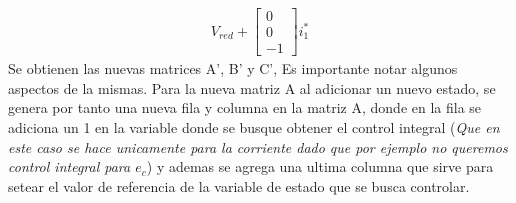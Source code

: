 \documentclass[
  11pt,
  letterpaper,
   addpoints,
   answers
  ]{exam}
\begin{document}
\begin{questions}
\begin{solution}
\begin{align}
            V_{red}
            +
            \begin{bmatrix}
                0\\
                0\\
                -1
            \end{bmatrix}
            i^{*}_{1}
        \end{align}
        Se obtienen las nuevas matrices A', B' y C', Es importante notar algunos aspectos de la mismas. Para la nueva matriz A al adicionar un nuevo estado, se genera por tanto una nueva fila y columna en la matriz A, donde en la fila se adiciona un 1 en la variable donde se busque obtener el control integral (\textit{Que en este caso se hace unicamente para la corriente dado que por ejemplo no queremos control integral para $e_{c}$}) y ademas se agrega una ultima columna que sirve para setear el valor de referencia de la variable de estado que se busca controlar.


\end{solution}
\end{questions}
\end{document}
